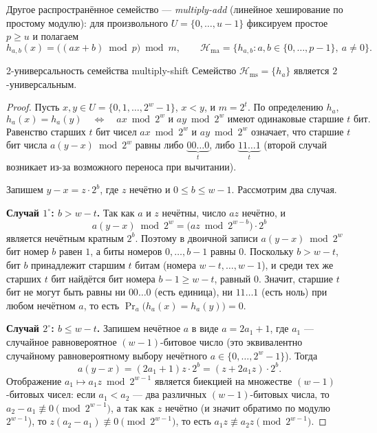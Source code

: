 \begin{Remark}{}{}
	Другое распространённое семейство --- \emph{multiply-add} (линейное хеширование по простому модулю): для произвольного $U = \{0,\ldots,u-1\}$ фиксируем простое $p \geq u$ и полагаем
	\[
	h_{a,b}(x) = \bigl((ax + b) \bmod p\bigr) \bmod m,
	\qquad
	\mathcal{H}_{\mathrm{ma}} = \{h_{a,b} : a,b \in \{0,\ldots,p-1\},\ a \neq 0\}.
	\]
\end{Remark}

\begin{Theorem}{2-универсальность семейства multiply-shift}{}
	Семейство $\mathcal{H}_{\mathrm{ms}} = \{h_a\}$ является $2$-универсальным.
\end{Theorem}

\begin{proof}
	Пусть $x,y \in U = \{0,1,\ldots,2^w-1\}$, $x < y$, и $m = 2^t$. По определению $h_a$,
	\[
	h_a(x) = h_a(y)
	\quad\Longleftrightarrow\quad
	ax \bmod 2^w \text{ и } ay \bmod 2^w \text{ имеют одинаковые старшие } t \text{ бит}.
	\]
	Равенство старших $t$ бит чисел $ax \bmod 2^w$ и $ay \bmod 2^w$ означает, что старшие $t$ бит числа $a(y-x) \bmod 2^w$ равны либо $\underbrace{00\ldots0}_{t}$, либо $\underbrace{11\ldots1}_{t}$ (второй случай возникает из-за возможного переноса при вычитании).
	
	Запишем $y - x = z \cdot 2^b$, где $z$ нечётно и $0 \leq b \leq w-1$. Рассмотрим два случая.
	
	\textbf{Случай $1^\circ$: $b > w - t$.}
	Так как $a$ и $z$ нечётны, число $az$ нечётно, и
	\[
	a(y-x) \bmod 2^w = \bigl(az \bmod 2^{w-b}\bigr) \cdot 2^b
	\]
	является нечётным кратным $2^b$. Поэтому в двоичной записи $a(y-x) \bmod 2^w$ бит номер $b$ равен $1$, а биты номеров $0,\ldots,b-1$ равны $0$. Поскольку $b > w-t$, бит $b$ принадлежит старшим $t$ битам (номера $w-t,\ldots,w-1$), и среди тех же старших $t$ бит найдётся бит номера $b-1 \geq w-t$, равный $0$. Значит, старшие $t$ бит не могут быть равны ни $00\ldots0$ (есть единица), ни $11\ldots1$ (есть ноль) при любом нечётном $a$, то есть $\Pr_a\bigl(h_a(x) = h_a(y)\bigr) = 0$.
	
	\textbf{Случай $2^\circ$: $b \leq w - t$.}
	Запишем нечётное $a$ в виде $a = 2a_1 + 1$, где $a_1$ --- случайное равновероятное $(w-1)$-битовое число (это эквивалентно случайному равновероятному выбору нечётного $a \in \{0,\ldots,2^w-1\}$). Тогда
	\[
	a(y-x) = (2a_1+1) z \cdot 2^b = (z + 2a_1 z) \cdot 2^b.
	\]
	Отображение $a_1 \mapsto a_1 z \bmod 2^{w-1}$ является биекцией на множестве $(w-1)$-битовых чисел: если $a_1 < a_2$ --- два различных $(w-1)$-битовых числа, то $a_2 - a_1 \not\equiv 0 \pmod{2^{w-1}}$, а так как $z$ нечётно (и значит обратимо по модулю $2^{w-1}$), то $z(a_2-a_1) \not\equiv 0 \pmod{2^{w-1}}$, то есть $a_1 z \not\equiv a_2 z \pmod{2^{w-1}}$.
	

\end{proof}
